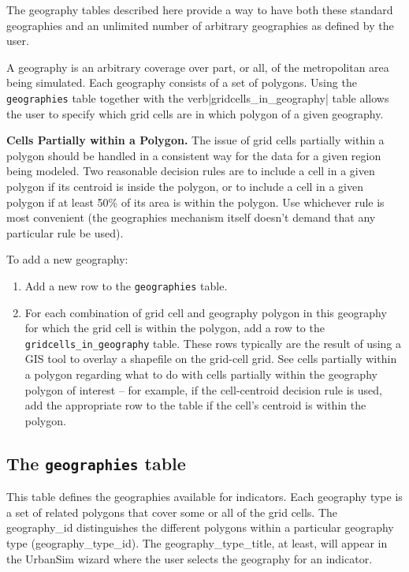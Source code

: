 The geography tables described here provide a way to have both these standard
geographies and an unlimited number of arbitrary geographies as
defined by the user.

A geography is an arbitrary coverage over part, or all, of the metropolitan
area being simulated. Each geography consists of a set of polygons. Using the
\verb|geographies| table together with the verb|gridcells_in_geography| table
allows the user to specify which grid cells are in which polygon of a given
geography.

\textbf{Cells Partially within a Polygon.}
The issue of grid cells partially within a polygon should be handled in a
consistent way for the data for a given region being modeled. Two reasonable
decision rules are to include a cell in a given polygon if its centroid is
inside the polygon, or to include a cell in a given polygon if at least 50\% of
its area is within the polygon. Use whichever rule is most convenient (the
geographies mechanism itself doesn't demand that any particular rule be used).

To add a new geography:
\begin{enumerate}
\item Add a new row to the \verb|geographies| table.
\item For each combination of grid cell and geography polygon in this geography
for which the grid cell is within the polygon, add a row to the \verb|gridcells_in_geography| table. These rows typically are the result of using a
GIS tool to overlay a shapefile on the grid-cell grid. See cells partially
within a polygon regarding what to do with cells partially within the geography
polygon of interest -- for example, if the cell-centroid decision rule is used,
add the appropriate row to the table if the cell's centroid is within the
polygon.
\end{enumerate}
\subsection{The {\tt geographies} table}

This table defines the geographies available for indicators. Each
geography type is a set of related polygons that cover some or all of the grid
cells. The geography_id distinguishes the different polygons within a
particular geography type (geography_type_id). The geography_type_title, at
least, will appear in the UrbanSim wizard where the user selects the geography
for an indicator.

